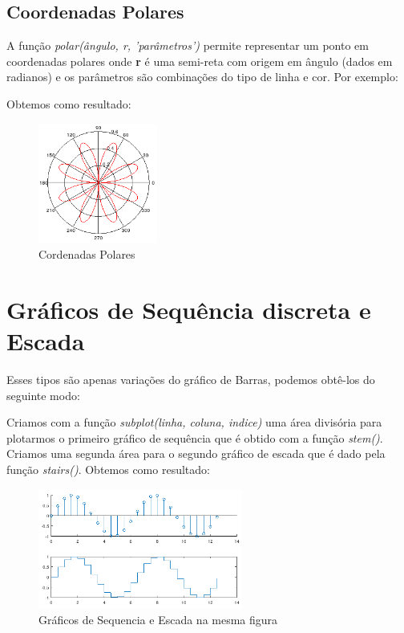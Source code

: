 \documentclass[a4paper,11pt]{article}
\begin{document}
\subsection{Coordenadas Polares}
A função \textit{polar(ângulo, r, 'parâmetros')} permite representar um ponto em coordenadas polares onde \textbf{r} é uma semi-reta com origem em ângulo (dados em radianos) e os parâmetros são combinações do tipo de linha e cor. Por exemplo: \\

Obtemos como resultado:
\begin{figure}[H]
	\centering
	\includegraphics[width=0.35\textwidth]{imagem/polar}
	\caption{Cordenadas Polares}
\end{figure}

\section{Gráficos de Sequência discreta e Escada}
Esses tipos são apenas variações do gráfico de Barras, podemos obtê-los do seguinte modo: \\

Criamos com a função \textit{subplot(linha, coluna, indice)} uma área divisória para plotarmos o primeiro gráfico de sequência que é obtido com a função \textit{stem()}. Criamos uma segunda área para o segundo gráfico de escada que é dado pela função \textit{stairs()}. Obtemos como resultado:
\begin{figure}[H]
	\centering
	\includegraphics[width=0.6\textwidth]{imagem/sequenciaEscada}
	\caption{Gráficos de Sequencia e Escada na mesma figura}
\end{figure}
\end{document}
